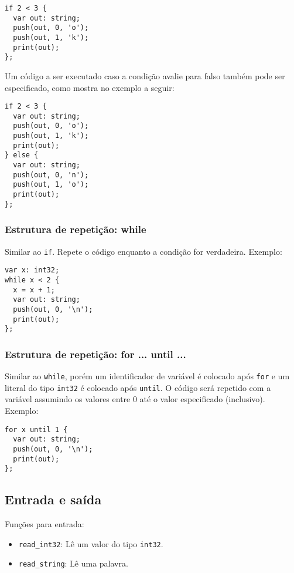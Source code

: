 \documentclass[12pt, a4paper]{article}
\begin{document}
\begin{verbatim}
if 2 < 3 {
  var out: string;
  push(out, 0, 'o');
  push(out, 1, 'k');
  print(out);
};
\end{verbatim}

Um código a ser executado caso a condição avalie para falso também pode ser
especificado, como mostra no exemplo a seguir:

\begin{verbatim}
if 2 < 3 {
  var out: string;
  push(out, 0, 'o');
  push(out, 1, 'k');
  print(out);
} else {
  var out: string;
  push(out, 0, 'n');
  push(out, 1, 'o');
  print(out);
};
\end{verbatim}

\subsubsection{Estrutura de repetição: while}

Similar ao \texttt{if}. Repete o código enquanto a condição for
verdadeira. Exemplo:

\begin{verbatim}
var x: int32;
while x < 2 {
  x = x + 1;
  var out: string;
  push(out, 0, '\n');
  print(out);
};
\end{verbatim}

\subsubsection{Estrutura de repetição: for ... until ...}

Similar ao \texttt{while}, porém um identificador de variável é colocado após
\texttt{for} e um literal do tipo \texttt{int32} é colocado após
\texttt{until}. O código será repetido com a variável assumindo os valores entre
$0$ até o valor especificado (inclusivo). Exemplo:

\begin{verbatim}
for x until 1 {
  var out: string;
  push(out, 0, '\n');
  print(out);
};
\end{verbatim}

\subsection{Entrada e saída}

Funções para entrada:

\begin{itemize}
\item \texttt{read\_int32}: Lê um valor do tipo \texttt{int32}.
\item \texttt{read\_string}: Lê uma palavra.
\end{itemize}
\end{document}
